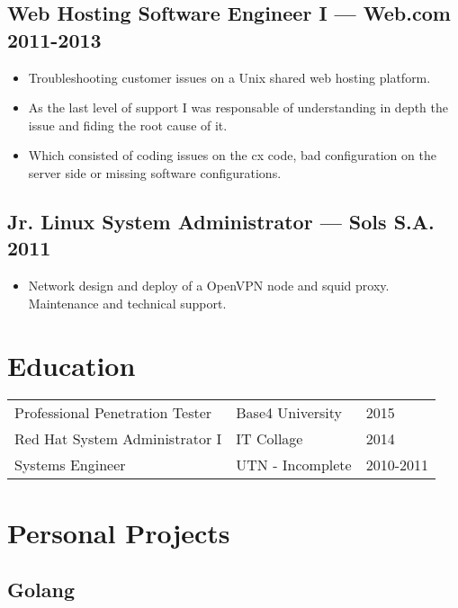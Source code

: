 \documentclass[11pt]{article}
\begin{document}
\subsection{Web Hosting Software Engineer I --- Web.com \hfill 2011-2013}
\begin{itemize}
  \setlength{\parskip}{0pt}
  \setlength{\itemsep}{0pt plus 1pt}
\item Troubleshooting customer issues on a Unix shared web hosting platform.
\item As the last level of support I was responsable of understanding in depth the issue and fiding the root cause of it.
\item Which consisted of coding issues on the cx code, bad configuration on the server side or missing software configurations.
\end{itemize}

\subsection{Jr. Linux System Administrator --- Sols S.A. \hfill 2011}
\begin{itemize}
  \setlength{\parskip}{0pt}
  \setlength{\itemsep}{0pt plus 1pt}
\item Network design and deploy of a OpenVPN node and squid proxy. Maintenance and technical support.
\end{itemize}


\section{Education}


\begin{tabular}{@{}lll@{}}
  \hspace{.1em} Professional Penetration Tester & Base4 University & 2015 \\
  \hspace{.1em} Red Hat System Administrator I  & IT Collage       & 2014 \\
  \hspace{.1em} Systems Engineer                & UTN - Incomplete & 2010-2011\\
\end{tabular}


\section{Personal Projects}


\subsection{Golang}
\end{document}
